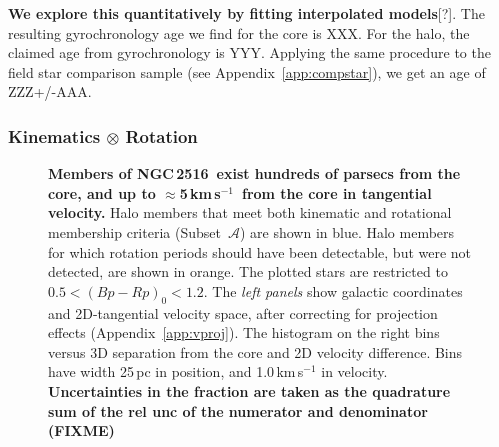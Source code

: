 \documentclass[12pt,twocolumn,tighten]{aastex63}
\newcommand{\cn}{NGC\,2516} %
\newcommand{\kms}{\,km\,s$^{-1}$}
\begin{document}
{\bf We explore this quantitatively by fitting interpolated
models}[?].  The resulting gyrochronology age we find for the core is
XXX.  For the halo, the claimed age from gyrochronology is YYY.
Applying the same procedure to the field star comparison sample (see
Appendix~\ref{app:compstar}), we get an age of ZZZ+/-AAA.

\subsubsection{Kinematics $\otimes$ Rotation}

\begin{figure}[t]
	\begin{center}
	\end{center}
	\vspace{-0.7cm}
  \caption{ 
  {\bf Members of \cn\ exist hundreds of parsecs from the core,
  and up to $\approx$5\kms\ from the core in tangential velocity.}
  Halo members that meet both kinematic and rotational membership
  criteria (Subset~$\mathcal{A}$) are shown in blue.  Halo members for which rotation periods
  should have been detectable, but were not detected, are shown in
  orange.  
  The plotted stars are restricted to $0.5<(Bp-Rp)_0<1.2$.
  The {\it left panels} show galactic coordinates and
  2D-tangential velocity space, after
  correcting for projection effects
  (Appendix~\ref{app:vproj}).
  The histogram on the right bins versus 3D separation from the core
  and 2D velocity difference.  Bins have width 25\,pc in position, and
  1.0\,km\,s$^{-1}$ in velocity.  {\bf Uncertainties in the fraction
  are taken as the quadrature sum of the rel unc of the numerator and
  denominator (FIXME)}
  \label{fig:physical_x_rotn}
	}
\end{figure}
\end{document}
